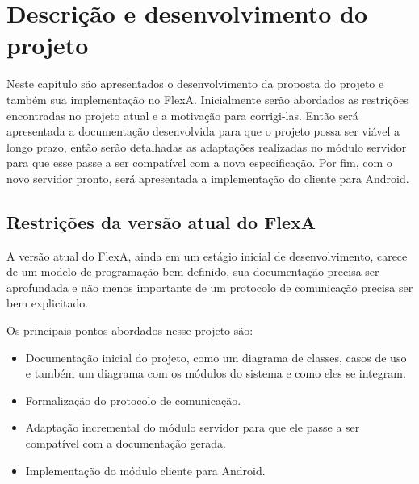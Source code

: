 


\chapter{Descrição e desenvolvimento do projeto}
\label{cap3}

    Neste capítulo são apresentados o desenvolvimento da proposta do projeto e também sua implementação no FlexA. Inicialmente serão abordados as restrições encontradas no projeto atual e a motivação para corrigi-las. Então será apresentada a documentação desenvolvida para que o projeto possa ser viável a longo prazo, então serão detalhadas as adaptações realizadas no módulo servidor para que esse passe a ser compatível com a nova especificação. Por fim, com o novo servidor pronto, será apresentada a implementação do cliente para Android.
    
    
    \section{Restrições da versão atual do FlexA}
    
        A versão atual do FlexA, ainda em um estágio inicial de desenvolvimento, carece de um modelo de programação bem definido, sua documentação precisa ser aprofundada e não menos importante de um protocolo de comunicação precisa ser bem explicitado.
        
        Os principais pontos abordados nesse projeto são:
        
        \begin{itemize}
            \item Documentação inicial do projeto, como um diagrama de classes, casos de uso e também um diagrama com os módulos do sistema e como eles se integram.
            \item Formalização do protocolo de comunicação.
            \item Adaptação incremental do módulo servidor para que ele passe a ser compatível com a documentação gerada.
            \item Implementação do módulo cliente para Android.
        \end{itemize}
        
